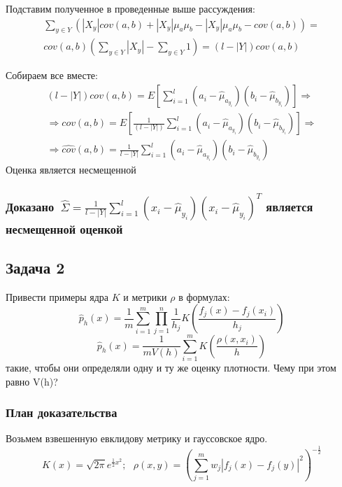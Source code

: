 \documentclass[12pt]{article}
\begin{document}
Подставим полученное в проведенные выше рассуждения:
\begin{align*}
    \sum_{y \in Y} \left(|X_y| cov(a, b) + |X_y| \mu_a \mu_b - |X_y| \mu_a \mu_b - cov(a, b)\right) = \\
    cov(a,b) \left(\sum_{y \in Y}|X_y| - \sum_{y \in Y} 1\right) = (l - |Y|) cov(a, b)
\end{align*}

Собираем все вместе:
\begin{align*}
    (l - |Y|) cov(a, b) = E\left[\sum_{i = 1}^{l}(a_i - \hat{\mu}_{a_{y_i}}) (b_i - \hat{\mu}_{b_{y_i}})\right] \Rightarrow \\
    \Rightarrow cov(a, b) = E\left[\frac{1}{(l - |Y|)} \sum_{i = 1}^{l}(a_i - \hat{\mu}_{a_{y_i}}) (b_i - \hat{\mu}_{b_{y_i}})\right] \Rightarrow \\
    \Rightarrow \hat{cov}(a, b) = \frac{1}{l - |Y|} \sum_{i = 1}^{l}(a_i - \hat{\mu}_{a_{y_i}}) (b_i - \hat{\mu}_{b_{y_i}})
\end{align*}
Оценка является несмещенной

\subsubsection*{Доказано~$\hat{\Sigma} = \frac{1}{l - |Y|} \sum_{i=1}^{l}(x_i - \hat{\mu}_{y_i}) (x_i - \hat{\mu}_{y_i})^{T}$ является несмещенной оценкой}

\subsection*{Задача 2}
Привести примеры ядра $ K $ и метрики $ \rho $ в формулах:
$$
    \hat{p}_h(x) = \frac{1}{m}\sum_{i = 1}^{m} \prod_{j = 1}^{n} \frac{1}{h_j} K\left(\frac{f_j(x) - f_j(x_i)}{h_j}\right)
$$
$$
    \hat{p}_h(x) = \frac{1}{m V(h)}\sum_{i = 1}^{m} K\left(\frac{\rho(x,x_i)}{h}\right)
$$
такие, чтобы они определяли одну и ту же оценку плотности. Чему при этом равно V(h)?

\subsubsection*{План доказательства}
Возьмем взвешенную евклидову метрику и гауссовское ядро.
$$
    K(x) = \sqrt{2 \pi} e^{\frac{1}{2} x^2}; \mbox{        }
    \rho(x, y) = \left(\sum_{j = 1}^{m} w_j |f_j(x) - f_j(y)|^2\right)^{-\frac{1}{2}}
$$
\end{document}
